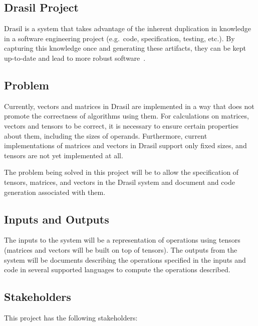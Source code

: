 \documentclass{article}
\begin{document}
\subsection{Drasil Project}

Drasil is a system that takes advantage of the inherent duplication in knowledge in a
software engineering project (e.g.~code, specification, testing, etc.). By capturing
this knowledge once and generating these artifacts, they can be kept up-to-date and
lead to more robust software~\cite{Carette_Drasil_2021}.



\subsection{Problem}
Currently, vectors and matrices in Drasil are implemented in a way that does not 
promote the correctness of algorithms using them. For calculations on matrices,
vectors and tensors to be correct, it is necessary to ensure certain properties
about them, including the sizes of operands. Furthermore, current implementations
of matrices and vectors in Drasil support only fixed sizes, and tensors are not
yet implemented at all.

The problem being solved in this project will be to allow the specification of
tensors, matrices, and vectors in the Drasil system and document and code generation 
associated with them.

\subsection{Inputs and Outputs}

The inputs to the system will be a representation of operations using tensors
(matrices and vectors will be built on top of tensors). The outputs from the
system will be documents describing the operations specified in the inputs and
code in several supported languages to compute the operations described.


\subsection{Stakeholders}
This project has the following stakeholders:
\end{document}
